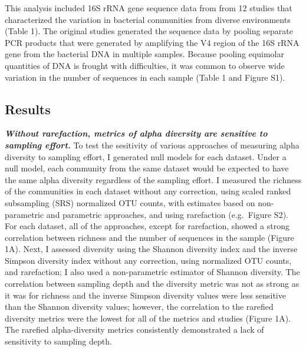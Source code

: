 \documentclass[
]{article}
\begin{document}
This analysis included 16S rRNA gene sequence data from from 12 studies
that characterized the variation in bacterial communities from diverse
environments (Table 1). The original studies generated the sequence data
by pooling separate PCR products that were generated by amplifying the
V4 region of the 16S rRNA gene from the bacterial DNA in multiple
samples. Because pooling equimolar quantities of DNA is frought with
difficulties, it was common to observe wide variation in the number of
sequences in each sample (Table 1 and Figure S1).

\hypertarget{results}{%
\subsection{Results}\label{results}}

\textbf{\emph{Without rarefaction, metrics of alpha diversity are
sensitive to sampling effort.}} To test the sesitivity of various
approaches of measuring alpha diversity to sampling effort, I generated
null models for each dataset. Under a null model, each community from
the same dataset would be expected to have the same alpha diversity
regardless of the sampling effort. I measured the richness of the
communities in each dataset without any correction, using scaled ranked
subsampling (SRS) normalized OTU counts, with estimates based on
non-parametric and parametric approaches, and using rarefaction
(e.g.~Figure S2). For each dataset, all of the approaches, except for
rarefaction, showed a strong correlation between richness and the number
of sequences in the sample (Figure 1A). Next, I assessed diversity using
the Shannon diversity index and the inverse Simpson diversity index
without any correction, using normalized OTU counts, and rarefaction; I
also used a non-parametric estimator of Shannon diversity. The
correlation between sampling depth and the diversity metric was not as
strong as it was for richness and the inverse Simpson diversity values
were less sensitive than the Shannon diversity values; however, the
correlation to the rarefied diversity metrics were the lowest for all of
the metrics and studies (Figure 1A). The rarefied alpha-diversity
metrics consistently demonstrated a lack of sensitivity to sampling
depth.
\end{document}
